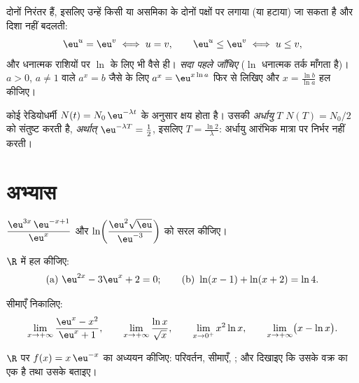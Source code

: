 \begin{method}\label{met:g12:exp:equations}
दोनों  निरंतर  हैं, इसलिए उन्हें किसी  या असमिका के दोनों
पक्षों पर लगाया (या हटाया) जा सकता है और दिशा नहीं बदलती:
\[
\eu^{u} = \eu^{v} \iff u = v, \qquad
\eu^{u} \leq \eu^{v} \iff u \leq v,
\]
और धनात्मक राशियों पर $\ln$ के लिए भी वैसे ही। \emph{ सदा पहले जाँचिए}
($\ln$ धनात्मक तर्क माँगता है)। $a>0$, $a \neq 1$ वाले $a^x = b$ जैसे  के लिए
$a^x = \eu^{x\ln a}$ फिर से लिखिए और $x = \frac{\ln b}{\ln a}$ हल कीजिए।
\end{method}

\begin{example}\label{ex:g12:exp:halflife}
कोई रेडियोधर्मी  $N(t) = N_0\,\eu^{-\lambda t}$ के अनुसार क्षय होता है। उसकी \emph{अर्धायु}
$T$ $N(T) = N_0/2$ को संतुष्ट करती है, \emph{अर्थात्} $\eu^{-\lambda T} = \frac12$, इसलिए $T = \frac{\ln 2}{\lambda}$: अर्धायु
आरंभिक मात्रा पर निर्भर नहीं करती।
\end{example}

\section{अभ्यास}

\begin{exercise}[$\star$]\label{exo:g12:exp:1}
$\dfrac{\eu^{3x}\,\eu^{-x+1}}{\eu^{x}}$ और $\ln\!\left(\dfrac{\eu^2\sqrt{\eu}}{\eu^{-3}}\right)$ को सरल कीजिए।
\end{exercise}

\begin{exercise}[$\star$]\label{exo:g12:exp:2}
$\R$ में हल कीजिए:
\[
\text{(a) } \eu^{2x} - 3\eu^{x} + 2 = 0;
\qquad
\text{(b) } \ln(x - 1) + \ln(x + 2) = \ln 4 .
\]
\end{exercise}

\begin{exercise}[$\star$]\label{exo:g12:exp:3}
सीमाएँ निकालिए:
\[
\lim_{x\to+\infty} \frac{\eu^x - x^2}{\eu^x + 1}, \qquad
\lim_{x\to+\infty} \frac{\ln x}{\sqrt x}, \qquad
\lim_{x\to0^+} x^2 \ln x, \qquad
\lim_{x\to+\infty} \bigl(x - \ln x\bigr).
\]
\end{exercise}

\begin{exercise}[$\star\star$]\label{exo:g12:exp:4}
$\R$ पर  $f(x) = x\,\eu^{-x}$ का अध्ययन कीजिए: परिवर्तन, सीमाएँ, ; और दिखाइए कि
उसके वक्र का एक  है तथा उसके  बताइए।
\end{exercise}


